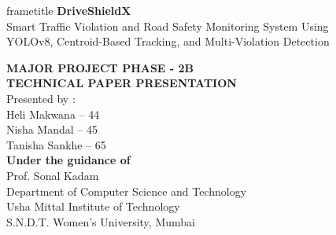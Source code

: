 \documentclass[aspectratio=169,10pt,t]{beamer}
\newcommand{\rollHeli}{44}
\newcommand{\rollNisha}{45}
\newcommand{\rollTanisha}{65}
\begin{document}
{
\begin{frame}[plain]
\vspace*{-0.2em}
\begin{beamercolorbox}[wd=\textwidth,center,sep=0.55em]{frametitle}
  {\fontsize{24}{26}\selectfont\bfseries DriveShieldX}\\[0.35em]
  {\normalsize Smart Traffic Violation and Road Safety Monitoring System Using\\
   YOLOv8, Centroid-Based Tracking, and Multi-Violation Detection}
\end{beamercolorbox}
\vspace{0.7em}
\begin{center}
{\large\bfseries MAJOR PROJECT PHASE - 2B\\ TECHNICAL PAPER PRESENTATION}\\[0.6em]
{\small Presented by :\\
Heli Makwana -- \rollHeli\\
Nisha Mandal -- \rollNisha\\
Tanisha Sankhe -- \rollTanisha}\\[0.6em]
{\bfseries Under the guidance of}\\[0.25em]
Prof. Sonal Kadam\\[0.5em]
{\scriptsize Department of Computer Science and Technology\\
Usha Mittal Institute of Technology\\[0.2em]
S.N.D.T. Women's University, Mumbai}
\end{center}
\end{frame}
}
\end{document}
